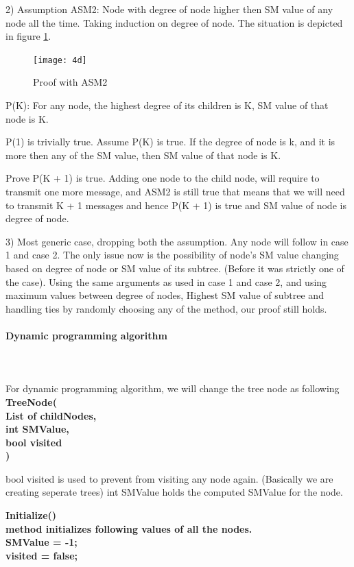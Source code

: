 2) Assumption ASM2: Node with degree of node higher then SM value of any node all the time. 
Taking induction on degree of node. The situation is depicted in figure \ref{fig:4d}. 

\begin{figure}[4d]
    \centering
    \texttt{[image: 4d]}
    \caption{Proof with ASM2}
    \label{fig:4d}
\end{figure}
 
P(K): For any node, the highest degree of  its children is K, SM value of that node is K. 

P(1) is trivially true. 
Assume P(K) is true. If the degree of node is k, and it is more then any of the SM value, then SM value of that node is K.  

Prove P(K + 1) is true. 
Adding one node to the child node, will require to transmit one more message, and ASM2 is still true that means that we will need to transmit K + 1 messages and hence P(K + 1) is true and SM value of node is degree of node.  

3) Most generic case, dropping both the assumption. 
Any node will follow in case 1 and case 2. The only issue now is the possibility of node's SM value changing based on degree of node or SM value of its subtree. (Before it was strictly one of the case). Using the same arguments as used in case 1 and case 2, and using maximum values between {degree of nodes, Highest SM  value of subtree} and handling ties by randomly choosing any of the method, our proof still holds. 

\paragraph{Dynamic programming algorithm} \\
\\
For dynamic programming algorithm, we will change the tree node as following \\
\textbf{TreeNode(\\
List of childNodes,  \\
int SMValue, \\
bool visited \\
)}

bool visited is used to prevent from visiting any node again. (Basically we are creating seperate trees)
int SMValue holds the computed SMValue for the node. 

\textbf{Initialize() \\
method initializes following values of all the nodes. \\
SMValue = -1; \\
visited = false;\\
}

